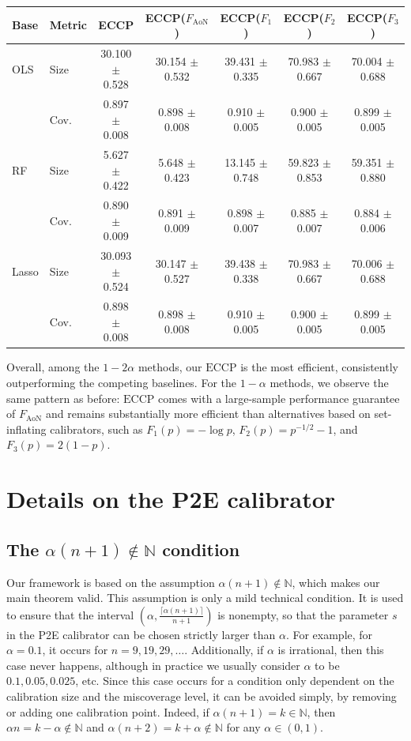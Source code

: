 \documentclass{article}
\theoremstyle{plain}
\theoremstyle{definition}
\theoremstyle{remark}
\begin{document}
\begin{table}[H]
\centering

\begin{tabular}{llccccc}
\toprule
Base & Metric & ECCP & ECCP($F_{\text{AoN}}$) & ECCP($F_1$) & ECCP($F_2$) & ECCP($F_3$) \\
\midrule
OLS & Size & 30.100 $\pm$ 0.528 & 30.154 $\pm$ 0.532 & 39.431 $\pm$ 0.335 & 70.983 $\pm$ 0.667 & 70.004 $\pm$ 0.688 \\
 & Cov. & 0.897 $\pm$ 0.008 & 0.898 $\pm$ 0.008 & 0.910 $\pm$ 0.005 & 0.900 $\pm$ 0.005 & 0.899 $\pm$ 0.005 \\
\midrule
RF & Size & 5.627 $\pm$ 0.422 & 5.648 $\pm$ 0.423 & 13.145 $\pm$ 0.748 & 59.823 $\pm$ 0.853 & 59.351 $\pm$ 0.880 \\
 & Cov. & 0.890 $\pm$ 0.009 & 0.891 $\pm$ 0.009 & 0.898 $\pm$ 0.007 & 0.885 $\pm$ 0.007 & 0.884 $\pm$ 0.006 \\
\midrule
Lasso & Size & 30.093 $\pm$ 0.524 & 30.147 $\pm$ 0.527 & 39.438 $\pm$ 0.338 & 70.983 $\pm$ 0.667 & 70.006 $\pm$ 0.688 \\
 & Cov. & 0.898 $\pm$ 0.008 & 0.898 $\pm$ 0.008 & 0.910 $\pm$ 0.005 & 0.900 $\pm$ 0.005 & 0.899 $\pm$ 0.005 \\
\bottomrule
\end{tabular}
\end{table}

Overall, among the $1-2\alpha$ methods, our $\mathrm{ECCP}$ is the most efficient, consistently outperforming the competing baselines. For the $1-\alpha$ methods, we observe the same pattern as before: $\mathrm{ECCP}$ comes with a large-sample performance guarantee of $F_{\mathrm{AoN}}$ and remains substantially more efficient than alternatives based on set-inflating calibrators, such as $F_1(p)=-\log p$, $F_2(p)=p^{-1/2}-1$, and $F_3(p)=2(1-p)$.


\section{Details on the P2E calibrator}
\subsection{The $\alpha(n+1)\notin \mathbb{N}$ condition}

Our framework is based on the assumption \(\alpha(n+1)\notin\mathbb N\), which makes our main theorem valid. This assumption is only a mild technical condition. It is used to ensure that the interval
$\left(\alpha,\frac{\lceil \alpha(n+1)\rceil}{n+1}\right)$
is nonempty, so that the parameter \(s\) in the P2E calibrator can be chosen strictly larger than \(\alpha\).  For example, for $\alpha=0.1$, it occurs for \(n=9,19,29,\ldots\). Additionally, if $\alpha$ is irrational, then this case never happens, although in practice we usually consider $\alpha$ to be $0.1, 0.05, 0.025$, etc.  Since this case occurs for a condition only dependent on the calibration size and the miscoverage level, it can be avoided simply, by removing or adding one calibration point.  Indeed, if \(\alpha(n+1)=k\in\mathbb N\), then $\alpha n=k-\alpha\notin\mathbb{N}$ and $\alpha(n+2) = k+\alpha\notin\mathbb{N}$ for any $\alpha\in (0,1).$ 
\end{document}
